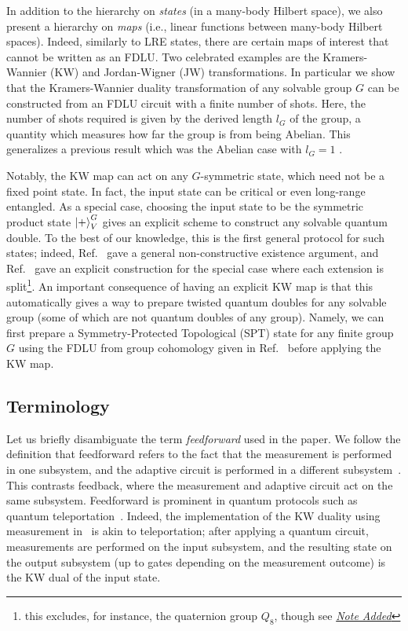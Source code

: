 \documentclass[nofootinbib,prx,twocolumn,showpacs,superscriptaddress,notitlepage,amsmath,amssymb]{revtex4-2}
\theoremstyle{definition}
\def\ket#1{\mathinner{|{#1}\rangle}}
\begin{document}
In addition to the hierarchy on \emph{states} (in a many-body Hilbert space), we also present a hierarchy on \emph{maps} (i.e., linear functions between many-body Hilbert spaces). Indeed, similarly to LRE states, there are certain maps of interest that cannot be written as an FDLU. Two celebrated examples are the Kramers-Wannier (KW) \cite{Wegner1971,Kogut1979,CobaneraOrtizNussinov2011,Haegeman_2015,Aasen16,VijayHaahFu2016,Williamson2016,KubicaYoshida2018,Pretko2018,ShirleySlagleChen2019,Radicevic2019} and Jordan-Wigner (JW) \cite{Jordan1928,SMLising,ChenKapustinRadicevic2018,ChenKapustin2019,Chen2019,Tantivasadakarn20,Shirley20,Po21,LiPo21} transformations. In particular we show that the Kramers-Wannier duality transformation of any solvable group $G$ can be constructed from an FDLU circuit with a finite number of shots. Here, the number of shots required is given by the derived length $l_G$ of the group, a quantity which measures how far the group is from being Abelian. This generalizes a previous result which was the Abelian case with $l_G=1$ \cite{measureSPT}.

Notably, the KW map can act on any $G$-symmetric state, which need not be a fixed point state. In fact, the input state can be critical or even long-range entangled. As a special case, choosing the input state to be the symmetric product state $\ket{+}^G_V$ gives an explicit scheme to construct any solvable quantum double. To the best of our knowledge, this is the first general protocol for such states; indeed, Ref.~ gave a general non-constructive existence argument, and Ref.~ gave an explicit construction for the special case where each extension is split\footnote{this excludes, for instance, the quaternion group $Q_8$, though see \hyperlink{Note}{\emph{Note Added}}}. An important consequence of having an explicit KW map is that this automatically gives a way to prepare twisted quantum doubles for any solvable group (some of which are not quantum doubles of any group). Namely, we can first prepare a Symmetry-Protected Topological (SPT) state for any finite group $G$ using the FDLU from group cohomology given in Ref.~ before applying the KW map.

\subsection{Terminology}

Let us briefly disambiguate the term \textit{feedforward} used in the paper. We follow the definition that feedforward refers to the fact that the measurement is performed in one subsystem, and the adaptive circuit is performed in a different subsystem~\cite{PhysRevApplied.9.034011}. This contrasts feedback, where the measurement and adaptive circuit act on the same subsystem. Feedforward is prominent in quantum protocols such as quantum teleportation~\cite{Teleportation,Ma2012teleportation}. Indeed, the implementation of the KW duality using measurement in~\cite{measureSPT} is akin to teleportation; after applying a quantum circuit, measurements are performed on the input subsystem, and the resulting state on the output subsystem (up to gates depending on the measurement outcome) is the KW dual of the input state.
\end{document}
